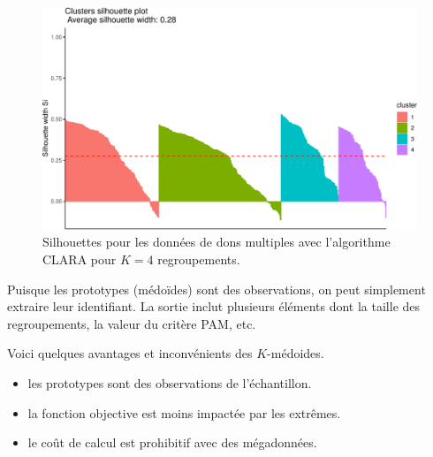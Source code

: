 \documentclass[
  11pt,
  letterpaper,
]{scrbook}
\newenvironment{Shaded}{\begin{snugshade}}{\end{snugshade}}
\newcommand{\CommentTok}[1]{\textcolor[rgb]{0.37,0.37,0.37}{#1}}
\newcommand{\DecValTok}[1]{\textcolor[rgb]{0.68,0.00,0.00}{#1}}
\newcommand{\NormalTok}[1]{\textcolor[rgb]{0.00,0.23,0.31}{#1}}
\newcommand{\OtherTok}[1]{\textcolor[rgb]{0.00,0.23,0.31}{#1}}
\newcommand{\SpecialCharTok}[1]{\textcolor[rgb]{0.37,0.37,0.37}{#1}}
\providecommand{\tightlist}{%
  \setlength{\itemsep}{0pt}\setlength{\parskip}{0pt}}\usepackage{longtable,booktabs,array}
\theoremstyle{definition}
\theoremstyle{remark}
\begin{document}
\begin{figure}[ht!]

{\centering \includegraphics[width=1\textwidth,height=\textheight]{./03-regroupements_files/figure-pdf/fig-clarasilhouette-1.pdf}

}

\caption{\label{fig-clarasilhouette}Silhouettes pour les données de dons
multiples avec l'algorithme CLARA pour \(K=4\) regroupements.}

\end{figure}

Puisque les prototypes (médoïdes) sont des observations, on peut
simplement extraire leur identifiant. La sortie inclut plusieurs
éléments dont la taille des regroupements, la valeur du critère PAM,
etc.

\begin{Shaded}
\end{Shaded}

Voici quelques avantages et inconvénients des \(K\)-médoides.

\begin{itemize}
\tightlist
\item
  les prototypes sont des observations de l'échantillon.
\item
  la fonction objective est moins impactée par les extrêmes.
\item
  le coût de calcul est prohibitif avec des mégadonnées.
\end{itemize}
\end{document}

